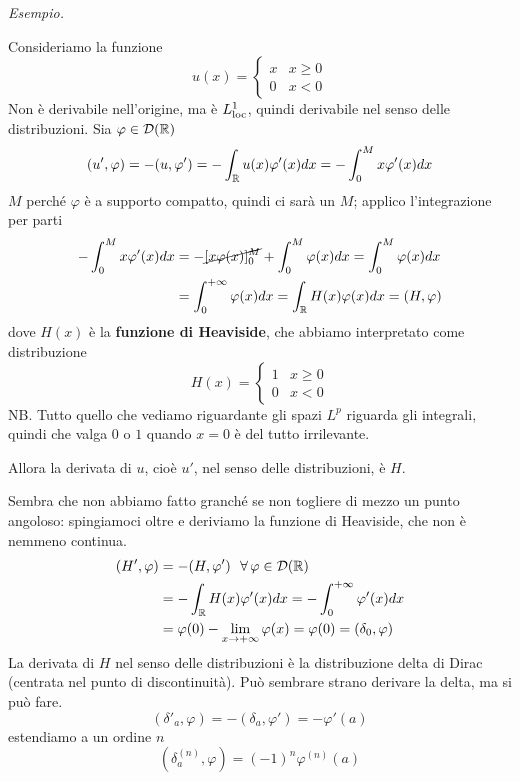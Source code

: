 \textit{Esempio.}

Consideriamo la funzione
\begin{equation*}
u(x) =
\begin{cases}
x & x \geq 0\\
0 & x < 0
\end{cases}
\end{equation*}
Non è derivabile nell'origine, ma è $L^{1}_{\operatorname{loc}}$, quindi derivabile nel senso delle distribuzioni. Sia $\varphi \in \mathcal{D}(\mathbb{R})$
\begin{equation*}
(u', \varphi) = - (u, \varphi') = - \int_{\mathbb{R}} u(x) \varphi'(x) dx = - \int^{M}_{0} x\varphi'(x) dx
\end{equation*}
$M$ perché $\varphi $ è a supporto compatto, quindi ci sarà un $M$; applico l'integrazione per parti
\begin{align*}
- \int^{M}_{0} x\varphi'(x) dx & = - \cancel{[x\varphi (x)]^{M}_{0}} + \int^{M}_{0} \varphi (x) dx = \int^{M}_{0} \varphi (x) dx\\
 & = \int^{+ \infty}_{0} \varphi (x) dx = \int_{\mathbb{R}} H(x) \varphi (x) dx = (H, \varphi)
\end{align*}
dove $H(x)$ è la \textbf{funzione di Heaviside}, che abbiamo interpretato come distribuzione
\begin{equation*}
H(x) =
\begin{cases}
1 & x \geq 0\\
0 & x < 0
\end{cases}
\end{equation*}
NB. Tutto quello che vediamo riguardante gli spazi $L^{p}$ riguarda gli integrali, quindi che valga $0$ o $1$ quando $x = 0$ è del tutto irrilevante.

Allora la derivata di $u$, cioè $u'$, nel senso delle distribuzioni, è $H$.

Sembra che non abbiamo fatto granché se non togliere di mezzo un punto angoloso: spingiamoci oltre e deriviamo la funzione di Heaviside, che non è nemmeno continua.
\begin{align*}
(H', \varphi) & = - (H, \varphi') \ \ \forall \varphi \in \Dc(\RR)\\
 & = - \int_{\RR} H(x) \varphi'(x) dx = - \int^{+ \infty}_{0} \varphi'(x) dx\\
 & = \varphi (0) - \lim_{x\rightarrow + \infty} \varphi (x) = \varphi (0) = (\delta_{0}, \varphi)
\end{align*}
La derivata di $H$ nel senso delle distribuzioni è la distribuzione delta di Dirac (centrata nel punto di discontinuità). Può sembrare strano derivare la delta, ma si può fare.
\begin{equation*}
(\delta'_{a}, \varphi) = - (\delta_{a}, \varphi') = - \varphi'(a)
\end{equation*}
estendiamo a un ordine $n$
\begin{equation*}
\left(\delta^{(n)}_{a}, \varphi \right) = (- 1)^{n} \varphi^{(n)}(a)
\end{equation*}

